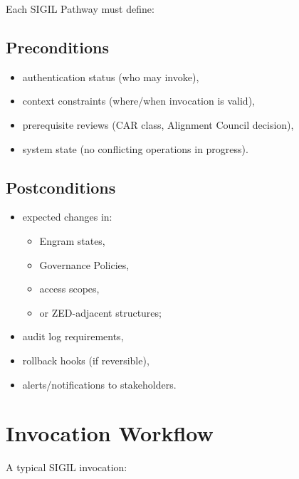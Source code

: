 Each SIGIL Pathway must define:

\subsection*{Preconditions}

\begin{itemize}
    \item authentication status (who may invoke),
    \item context constraints (where/when invocation is valid),
    \item prerequisite reviews (CAR class, Alignment Council decision),
    \item system state (no conflicting operations in progress).
\end{itemize}

\subsection*{Postconditions}

\begin{itemize}
    \item expected changes in:
          \begin{itemize}
              \item Engram states,
              \item Governance Policies,
              \item access scopes,
              \item or ZED-adjacent structures;
          \end{itemize}
    \item audit log requirements,
    \item rollback hooks (if reversible),
    \item alerts/notifications to stakeholders.
\end{itemize}

\section{Invocation Workflow}

A typical SIGIL invocation:

